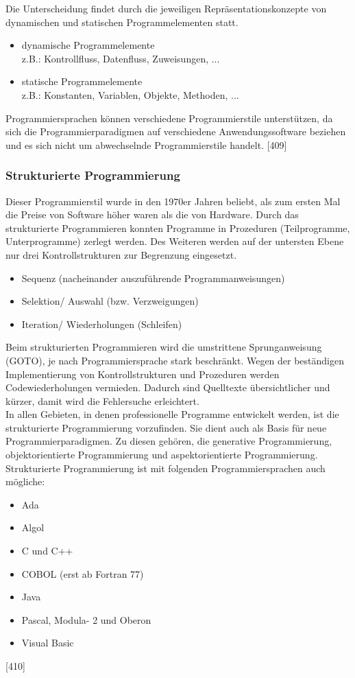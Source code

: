 \documentclass[12pt,a4paper]{report}
\begin{document}
\begin{onehalfspace}
Die Unterscheidung findet durch die jeweiligen Repräsentationskonzepte von dynamischen und statischen Programmelementen statt.
\begin{itemize}
\item dynamische Programmelemente\\
z.B.: Kontrollfluss, Datenfluss, Zuweisungen, ...
\item statische Programmelemente\\
z.B.: Konstanten, Variablen, Objekte, Methoden, ...
\end{itemize}
Programmiersprachen können verschiedene Programmierstile unterstützen, da sich die Programmierparadigmen auf verschiedene Anwendungssoftware beziehen und es sich nicht um abwechselnde Programmierstile handelt. [409]

\subsubsection{Strukturierte Programmierung}
Dieser Programmierstil wurde in den 1970er Jahren beliebt, als zum ersten Mal die Preise von Software höher waren als die von Hardware. Durch das strukturierte Programmieren konnten Programme in Prozeduren (Teilprogramme, Unterprogramme) zerlegt werden. Des Weiteren werden auf der untersten Ebene nur drei Kontrollstrukturen zur Begrenzung eingesetzt.
\begin{itemize}
\item Sequenz (nacheinander auszuführende Programmanweisungen)
\item Selektion/ Auswahl (bzw. Verzweigungen)
\item Iteration/ Wiederholungen (Schleifen)
\end{itemize}
Beim strukturierten Programmieren wird die umstrittene Sprunganweisung (GOTO), je nach Programmiersprache stark beschränkt. Wegen der beständigen Implementierung von Kontrollstrukturen und Prozeduren werden Codewiederholungen vermieden. Dadurch sind Quelltexte übersichtlicher und kürzer, damit wird die Fehlersuche erleichtert.\\

In allen Gebieten, in denen professionelle Programme entwickelt werden, ist die strukturierte Programmierung vorzufinden. Sie dient auch als Basis für neue Programmierparadigmen. Zu diesen gehören, die generative Programmierung, objektorientierte Programmierung und aspektorientierte Programmierung.
\\Strukturierte Programmierung ist mit folgenden Programmiersprachen auch mögliche:
\begin{itemize}
\item Ada
\item Algol
\item C und C++
\item COBOL (erst ab Fortran 77)
\item Java
\item Pascal, Modula- 2 und Oberon
\item Visual Basic
\end{itemize}
[410]

\end{onehalfspace}
\end{document}
